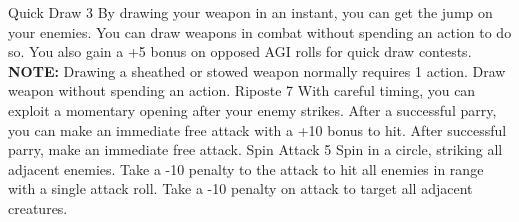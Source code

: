 \begin{path}
\skilldescription
{Quick Draw}
{3}
{By drawing your weapon in an instant, you can get the jump on your enemies. You can draw weapons in combat without spending an action to do so. You also gain a +5 bonus on opposed AGI rolls for quick draw contests.
\\\textbf{NOTE:} Drawing a sheathed or stowed weapon normally requires 1 action.}
{Draw weapon without spending an action.}
\skilldescription
{Riposte}
{7}
{With careful timing, you can exploit a momentary opening after your enemy strikes. After a successful parry, you can make an immediate free attack with a +10 bonus to hit.}
{After successful parry, make an immediate free attack.}
\skilldescription
{Spin Attack}
{5}
{Spin in a circle, striking all adjacent enemies. Take a -10 penalty to the attack to hit all enemies in range with a single attack roll.}
{Take a -10 penalty on attack to target all adjacent creatures.}

\end{path}
